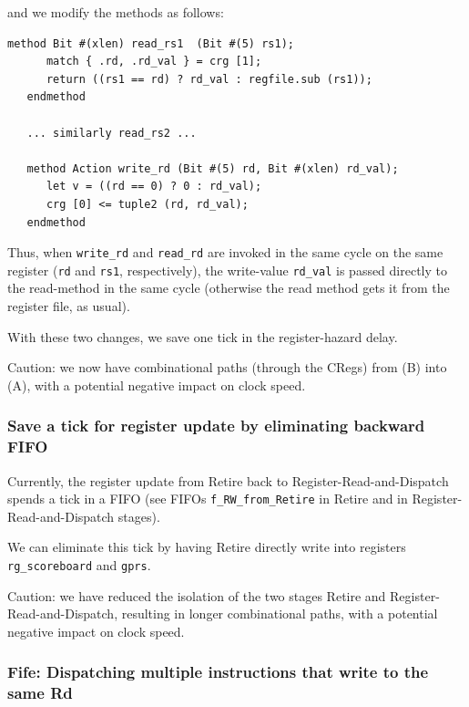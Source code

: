 and we modify the methods as follows:

{\footnotesize
\begin{Verbatim}[frame=single, label=src\_Common/GPRs.bsv]
   method Bit #(xlen) read_rs1  (Bit #(5) rs1);
      match { .rd, .rd_val } = crg [1];
      return ((rs1 == rd) ? rd_val : regfile.sub (rs1));
   endmethod

   ... similarly read_rs2 ...

   method Action write_rd (Bit #(5) rd, Bit #(xlen) rd_val);
      let v = ((rd == 0) ? 0 : rd_val);
      crg [0] <= tuple2 (rd, rd_val);
   endmethod
\end{Verbatim}
}

Thus, when \verb|write_rd| and \verb|read_rd| are invoked in the same
cycle on the same register (\verb|rd| and \verb|rs1|, respectively),
the write-value \verb|rd_val| is passed directly to the read-method in
the same cycle (otherwise the read method gets it from the register
file, as usual).

With these two changes, we save one tick in the register-hazard delay.

Caution: we now have combinational paths (through the CRegs) from
(B) into (A), with a potential negative impact on clock speed.


\subsubsection{Save a tick for register update by eliminating backward FIFO}

Currently, the register update from Retire back to
Register-Read-and-Dispatch spends a tick in a FIFO (see FIFOs
\verb|f_RW_from_Retire| in Retire and in Register-Read-and-Dispatch
stages).

We can eliminate this tick by having Retire directly write into
registers \verb|rg_scoreboard| and \verb|gprs|.

Caution: we have reduced the isolation of the two stages Retire and
Register-Read-and-Dispatch, resulting in longer combinational paths,
with a potential negative impact on clock speed.


\subsubsection{Fife: Dispatching multiple instructions that write to the same Rd}

